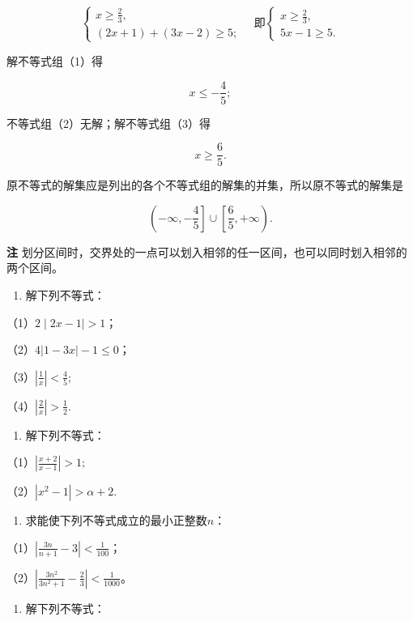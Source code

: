 \[
\left\{ \begin{array}{ll} {x\geqslant\frac{2}{3},} \\ {(2 x + 1) + (3 x - 2) \geqslant 5;} \end{array} \right. \quad \text{即} \left\{ \begin{array}{ll} {x \geqslant \frac{2}{3},} \\ {5 x - 1 \geqslant 5.} \end{array} \right. \tag {3}
\]

解不等式组（1）得

\[
x \leqslant - \frac{4}{5};
\]

不等式组（2）无解；解不等式组（3）得

\[
x \geqslant \frac{6}{5}.
\]

原不等式的解集应是列出的各个不等式组的解集的并集，所以原不等式的解集是

\[
\left(- \infty, - \frac{4}{5} \right] \cup \left[ \frac{6}{5}, + \infty\right).
\]

\textbf{注}
划分区间时，交界处的一点可以划入相邻的任一区间，也可以同时划入相邻的两个区间。

\begin{enumerate}
\item
  解下列不等式：
\end{enumerate}

（1）\(2 \mid 2x - 1 \mid > 1\)；

（2）\(4|1 - 3x| - 1 \leqslant 0\)；

（3）\(\left|\frac{1}{x}\right|<\frac{4}{5};\)

（4）\(\left|\frac{2}{x}\right|>\frac{1}{2}.\)

\begin{enumerate}[start=2]
\item
  解下列不等式：
\end{enumerate}

（1）\(\left|\frac{x + 2}{x - 1}\right| > 1;\)

（2）\(|x^{2}-1|>\alpha+2.\)

\begin{enumerate}[start=3]
\item
  求能使下列不等式成立的最小正整数\(n\)：
\end{enumerate}

（1）\(\left|\frac{3n}{n + 1} - 3\right| < \frac{1}{100}\)；

（2）\(\left|\frac{3n^2}{3n^2 + 1} - \frac{2}{3}\right| < \frac{1}{1000}\)。

\begin{enumerate}[start=4]
\item
  解下列不等式：
\end{enumerate}

